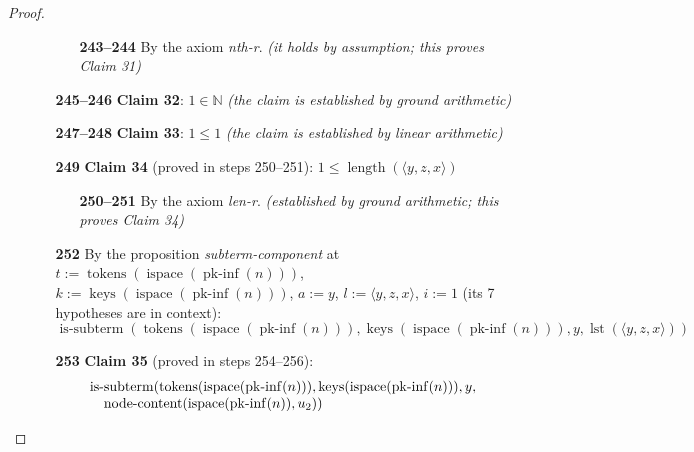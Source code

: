 \documentclass[11pt]{article}
\theoremstyle{plain}
\begin{document}
\begin{proof}
\begin{itemize}[leftmargin=2.8em, itemsep=4pt, parsep=1pt]
\begin{itemize}[leftmargin=2.8em, itemsep=4pt, parsep=1pt]
  \begin{itemize}[leftmargin=2.8em, itemsep=4pt, parsep=1pt]
  \item[\textbf{243--244}] By the axiom \emph{nth-r}.  \emph{(it holds by assumption; this proves Claim 31)}
  \end{itemize}
  \item[\textbf{245--246}] \textbf{Claim 32}: $1 \in \mathbb{N}$  \emph{(the claim is established by ground arithmetic)}
  \item[\textbf{247--248}] \textbf{Claim 33}: $1 \leq 1$  \emph{(the claim is established by linear arithmetic)}
  \item[\textbf{249}] \textbf{Claim 34} (proved in steps 250--251): $1 \leq \operatorname{length}(\langle y, z, x \rangle)$
  \begin{itemize}[leftmargin=2.8em, itemsep=4pt, parsep=1pt]
  \item[\textbf{250--251}] By the axiom \emph{len-r}.  \emph{(established by ground arithmetic; this proves Claim 34)}
  \end{itemize}
  \item[\textbf{252}] By the proposition \emph{subterm-component} at $t := \operatorname{tokens}(\operatorname{ispace}(\operatorname{pk\text{-}inf}(n)))$, $k := \operatorname{keys}(\operatorname{ispace}(\operatorname{pk\text{-}inf}(n)))$, $a := y$, $l := \langle y, z, x \rangle$, $i := 1$ (its 7 hypotheses are in context):
\begin{equation*}
\operatorname{is\text{-}subterm}(\operatorname{tokens}(\operatorname{ispace}(\operatorname{pk\text{-}inf}(n))), \operatorname{keys}(\operatorname{ispace}(\operatorname{pk\text{-}inf}(n))), y, \operatorname{lst}(\langle y, z, x \rangle))
\end{equation*}

  \item[\textbf{253}] \textbf{Claim 35} (proved in steps 254--256):
\begin{equation*}
\begin{array}{@{}l@{}} \operatorname{is\text{-}subterm}(\operatorname{tokens}(\operatorname{ispace}(\operatorname{pk\text{-}inf}(n))), \operatorname{keys}(\operatorname{ispace}(\operatorname{pk\text{-}inf}(n))), y, \\ \quad \operatorname{node\text{-}content}(\operatorname{ispace}(\operatorname{pk\text{-}inf}(n)), u_{2})) \end{array}
\end{equation*}


\end{itemize}
\end{itemize}
\end{proof}
\end{document}
